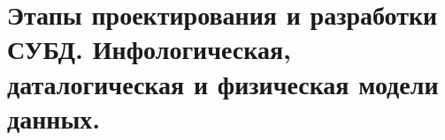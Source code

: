{
	\section{Этапы проектирования и разработки СУБД. Инфологическая, даталогическая и физическая модели данных.}
	\newpage
}
